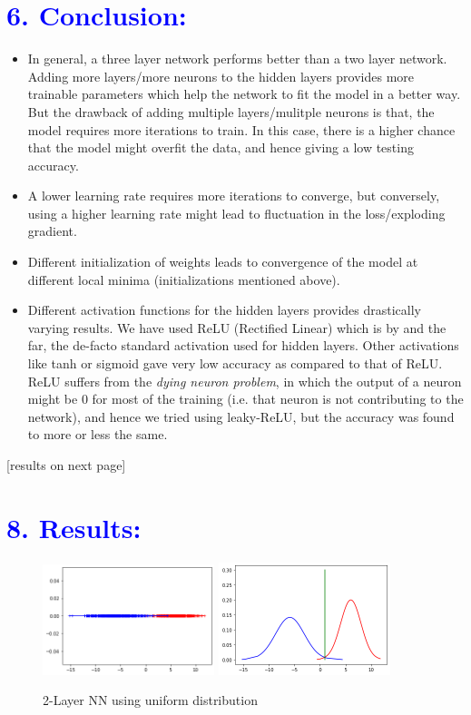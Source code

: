 \documentclass[a4paper,10pt,twoside]{article}
\begin{document}
\section*{\textcolor{blue}{6. Conclusion:}}
\begin{itemize}
\item{In general, a three layer network performs better than a two layer network. Adding more layers/more neurons to the hidden layers provides more trainable parameters which help the network to fit the model in a better way. But the drawback of adding multiple layers/mulitple neurons is that, the model requires more iterations to train. In this case, there is a higher chance that the model might overfit the data, and hence giving a low testing accuracy.}
\item{A lower learning rate requires more iterations to converge, but conversely, using a higher learning rate might lead to fluctuation in the loss/exploding gradient.}
\item{Different initialization of weights leads to convergence of the model at different local minima (initializations mentioned above).}
\item{Different activation functions for the hidden layers provides drastically varying results. We	 have used ReLU (Rectified Linear) which is by and the far, the de-facto standard activation used for hidden layers. Other activations like tanh or sigmoid gave very low accuracy as compared to that of ReLU. ReLU suffers from the \emph{dying neuron problem}, in which the output of a neuron might be 0 for most of the training (i.e. that neuron is not contributing to the network), and hence we tried using leaky-ReLU, but the accuracy was found to more or less the same.}
\end{itemize}
[results on next page]

\onecolumn
\section*{\textcolor{blue}{8. Results:}}
\begin{figure}[h!]
\centering
\includegraphics[scale=1.0, width=5cm]{Fig1.png}
\includegraphics[scale=1.0, width=5cm]{Fig2.png}
\caption*{2-Layer NN using uniform distribution}
\end{figure}
\end{document}
